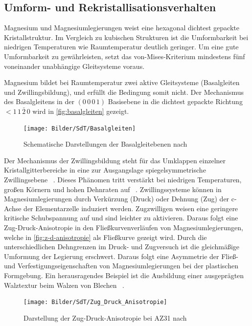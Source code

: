 \subsection{Umform- und Rekristallisationsverhalten}\label{sec:Umformverhalten}

Magnesium und Magnesiumlegierungen weist eine hexagonal dichtest gepackte Kristallstruktur.
Im Vergleich zu kubischen Strukturen ist die Umformbarkeit bei niedrigen Temperaturen wie Raumtemperatur deutlich geringer.
Um eine gute Umformbarkeit zu gewährleisten, setzt das von-Mises-Kriterium mindestens fünf voneinander unabhängige Gleitsysteme voraus. \cite{Schmidt.2011}

Magnesium bildet bei Raumtemperatur zwei aktive Gleitsysteme (Basalgleiten und Zwillingsbildung), und erfüllt die Bedingung somit nicht.
Der Mechanismus des Basalgleitens in der $(0\,0\,0\,1)$ Basisebene in die dichtest gepackte Richtung $<1\,1\,\bar{2}\,0$ wird in \autoref{fig:basalgleiten} gezeigt.

\begin{figure}[H]%
    \centering
    \texttt{[image: Bilder/SdT/Basalgleiten]}
    \caption[Basalgleitebenen]{Schematische Darstellungen der Basalgleitebenen nach \cite{Kammer.2000}}
    \label{fig:basalgleiten}
\end{figure}

Der Mechanismus der Zwillingsbildung steht für das Umklappen einzelner Kristallgitterbereiche in eine zur Ausgangslage spiegelsymmetrische Zwillingsebene \cite{Ullmann.2014}~.
Dieses Phänomen tritt verstärkt bei niedrigen Temperaturen, großen Körnern und hohen Dehnraten auf \cite{Ulacia.2011,Reh.1973}~.
Zwillingssysteme können in Magnesiumlegierungen durch Verkürzung (Druck) oder Dehnung (Zug) der c-Achse der Elementarzelle induziert werden.
Zugzwilligen weisen eine geringere kritische Schubspannung auf und sind leichter zu aktivieren.
Daraus folgt eine Zug-Druck-Anisotropie in den Fließkurvenverläufen von Magnesiumlegierungen, welche in \autoref{fig:z-d-anisotropie} als Fließkurve gezeigt wird.
Durch die unterschiedlichen Dehngrenzen im Druck- und Zugversuch ist die gleichmäßige Umformung der Legierung erschwert.
Daraus folgt eine Asymmetrie der Fließ- und Verfestigungseigenschaften von Magnesiumlegierungen bei der plastischen Formgebung.
Ein herausragendes Beispiel ist die Ausbildung einer ausgeprägten Walztextur beim Walzen von Blechen \cite{Steglich.2014,Schmidt.2011}~.

\begin{figure}[H]%
    \centering
    \texttt{[image: Bilder/SdT/Zug\_Druck\_Anisotropie]}
    \caption[Zug-Druck-Anisotropie]{Darstellung der Zug-Druck-Anisotropie bei AZ31 nach \cite{Schmidt.2011}}
    \label{fig:z-d-anisotropie}
\end{figure}

